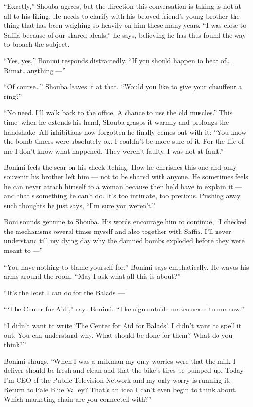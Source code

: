 \documentclass[twoside,11pt,openany]{book}
\begin{document}
``Exactly,'' Shouba agrees, but the direction this conversation is taking is not at all to his
liking. He needs to clarify with his beloved friend's young brother the thing that has been weighing so heavily on him
these many years. ``I was close to Saffia because of our shared ideals,'' he says, believing
he has thus found the way to broach the subject.

``Yes, yes,'' Bonimi responds distractedly. ``If you should happen to hear
of{\ldots}Rimat{\ldots}anything ---''

``Of course{{\ldots}}'' Shouba leaves it at that.
``Would you like to give your chauffeur a ring?''

``No need. I'll walk back to the office.  A chance to use the old muscles.'' This time, when
he extends his hand, Shouba grasps it warmly and prolongs the handshake. All inhibitions now forgotten he finally comes
out with it: ``You know the bomb-timers were absolutely ok. I couldn't be more sure of it. For the life of
me I don't know what happened. They weren't faulty. I was not at fault.''

Bonimi feels the scar on his cheek itching. How he cherishes this one and only souvenir his brother left him --- not to be
shared with anyone. He sometimes feels he can never attach himself to a woman because then he'd have to explain it ---
and that's something he can't do. It's too intimate, too precious. Pushing away such thoughts he just says,
``I'm sure you weren't.''

Boni sounds genuine to Shouba. His words encourage him to continue, ``I checked the mechanisms several
times myself and also together with Saffia. I'll never understand till my dying
day{ }why the damned{ }bombs exploded
before they were meant to ---''

``You have nothing to blame yourself for,'' Bonimi says emphatically. He waves his arms around
the room, ``May I ask what all this is about?''

``It's the least I can do for the Balads ---''

``{\thinspace}`The Center for Aid','' says Bonimi. ``The sign outside makes sense to me now.''

``I didn't want to write `The Center for Aid for Balads'. I didn't want to spell it out. You can understand
why. What should be done for them? What do you think?''

Bonimi shrugs. ``When I was a milkman my only worries were that the milk I deliver should be fresh and
clean and that the bike's tires be pumped up. Today I'm CEO of the Public Television Network and my only worry is
running it.  Return to Pale Blue Valley? That's an idea I can't even begin to think about. Which marketing chain are
you connected with?''
\end{document}
